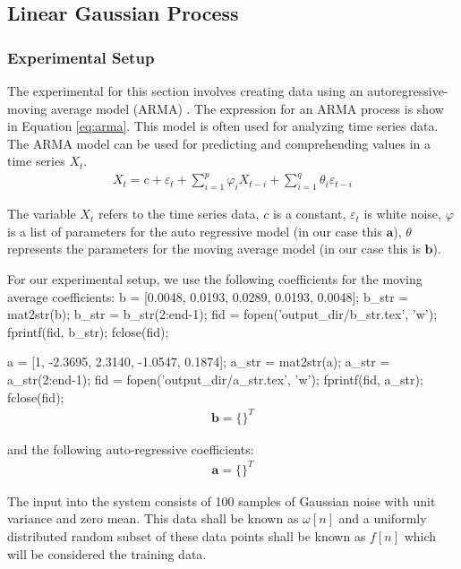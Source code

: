 \documentclass[11pt, twoside]{article}   	%
\newenvironment{matlab}{\comment}{\endcomment}
\begin{document}
\subsection{Linear Gaussian Process}
\subsubsection{Experimental Setup}
The experimental for this section involves creating data using an autoregressive-moving average model (ARMA)
. The expression for an ARMA process is show in Equation \ref{eq:arma}. This model is often used for analyzing
time series data. The ARMA model can be used for predicting and comprehending values in a time series $X_t$. 
\begin{align}
X_t = c + \varepsilon_t + \sum_{i=1}^p \varphi_i X_{t-i} + \sum_{i=1}^q \theta_i \varepsilon_{t-i} \label{eq:arma}
\end{align}

The variable $X_t$ refers to the time series data, $c$ is a constant, $\varepsilon_t$ is white noise, $\varphi$ is a
list of  parameters for the auto regressive model (in our case this $\mathbf{a}$), $\theta$ represents the parameters 
for the moving average model (in our case this is $\mathbf{b}$).

For our experimental setup, we use the following coefficients for the moving average coefficients: 
\begin{matlab}
b = [0.0048, 0.0193, 0.0289, 0.0193, 0.0048];
b_str = mat2str(b);
b_str = b_str(2:end-1);
fid = fopen('output_dir/b_str.tex', 'w'); 
fprintf(fid, b_str); 
fclose(fid); 

a = [1, -2.3695, 2.3140, -1.0547, 0.1874];
a_str = mat2str(a);
a_str = a_str(2:end-1);
fid = fopen('output_dir/a_str.tex', 'w'); 
fprintf(fid, a_str); 
fclose(fid); 
\end{matlab}
\begin{align}
\mathbf{b} = \{\}^T
\end{align}

and the following auto-regressive coefficients: 
\begin{align}
\mathbf{a} = \{\}^T
\end{align}

The input into the system consists of 100 samples of Gaussian 
noise with unit variance and zero mean. This data shall be known 
as $\omega[n]$ and a uniformly distributed random subset of these 
data points shall be known as $f[n]$ which will be considered the training 
data.
\end{document}
